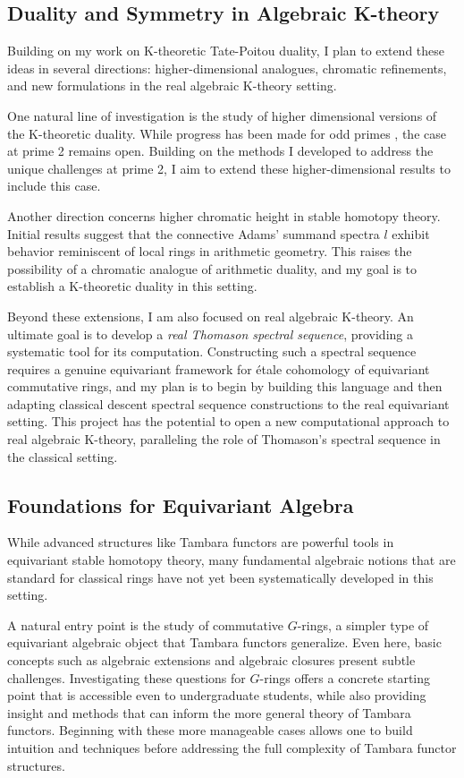 \documentclass[11pt]{article}
\begin{document}
\subsection*{Duality and Symmetry in Algebraic K-theory}
Building on my work on K-theoretic Tate-Poitou duality, I plan to extend these ideas in several directions: higher-dimensional analogues, chromatic refinements, and new formulations in the real algebraic K-theory setting.

One natural line of investigation is the study of higher dimensional versions of the K-theoretic duality.
While progress has been made for odd primes \cite{Braunling}, the case at prime 2 remains open.
Building on the methods I developed to address the unique challenges at prime 2, I aim to extend these higher-dimensional results to include this case.

Another direction concerns higher chromatic height in stable homotopy theory.
Initial results \cite{HRW} suggest that the connective Adams' summand spectra $l$ exhibit behavior reminiscent of local rings in arithmetic geometry.
This raises the possibility of a chromatic analogue of arithmetic duality, and my goal is to establish a K-theoretic duality in this setting.

Beyond these extensions, I am also focused on real algebraic K-theory.
An ultimate goal is to develop a {\it real Thomason spectral sequence}, providing a systematic tool for its computation.
Constructing such a spectral sequence requires a genuine equivariant framework for \'etale cohomology of equivariant commutative rings, and my plan is to begin by building this language and then adapting classical descent spectral sequence constructions to the real equivariant setting.
This project has the potential to open a new computational approach to real algebraic K-theory, paralleling the role of Thomason’s spectral sequence in the classical setting.


\subsection*{Foundations for Equivariant Algebra}
While advanced structures like Tambara functors are powerful tools in equivariant stable homotopy theory, many fundamental algebraic notions that are standard for classical rings have not yet been systematically developed in this setting.

A natural entry point is the study of commutative $G$-rings, a simpler type of equivariant algebraic object that Tambara functors generalize.
Even here, basic concepts such as algebraic extensions and algebraic closures present subtle challenges.
Investigating these questions for $G$-rings offers a concrete starting point that is accessible even to undergraduate students, while also providing insight and methods that can inform the more general theory of Tambara functors.
Beginning with these more manageable cases allows one to build intuition and techniques before addressing the full complexity of Tambara functor structures.
\end{document}
